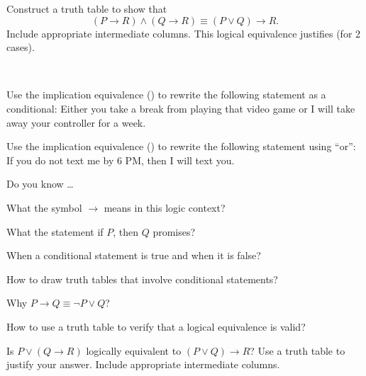 \begin{exer}[\exerU] %
\label{exer_truthtable_proof_cases}
    Construct a truth table to show that $$(P \to R) \land (Q \to R) \equiv (P \lor Q) \to R.$$  Include appropriate intermediate columns.
    This logical equivalence justifies  (for 2 cases).
\end{exer}

\begin{exer}[\exerU] %
\label{exer_rewrite_implication}
~
    \begin{exerpart}
        \item Use the implication equivalence () to rewrite the following statement as a conditional:  Either you take a break from playing that video game or I will take away your controller for a week.
        \item Use the implication equivalence () to rewrite the following statement using ``or'': If you do not text me by 6 PM, then I will text you.
    \end{exerpart}
\end{exer}

\begin{exer}[\exerR] %
\label{exer_dyk_iften}
    Do you know \ldots
        \begin{exerpart}
            \item What the symbol $\to$ means in this logic context?
            \item What the statement if $P$, then $Q$ promises?
            \item When a conditional statement is true and when it is false?
            \item How to draw truth tables that involve conditional statements?
            \item Why $P \to Q \equiv \neg P \lor Q$?
            \item How to use a truth table to verify that a logical equivalence is valid? 
        \end{exerpart}
\end{exer}

\begin{exer}[\exerE] %
\label{exer_equiv_PtoQtoR}
    Is $P \lor (Q \to R)$ logically equivalent to $(P \lor Q) \to R$?  Use a truth table to justify your answer. Include appropriate intermediate columns.       
\end{exer}

